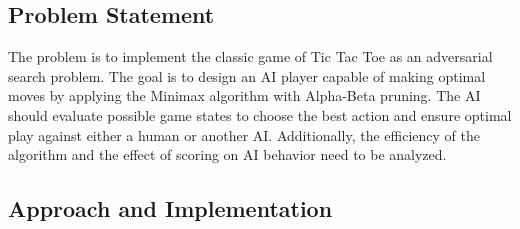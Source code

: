 \documentclass[14pt]{extreport}
\begin{document}


\pagebreak

\subsection*{Problem Statement}

The problem is to implement the classic game of Tic Tac Toe as an adversarial search problem. The goal is to design an AI player capable of making optimal moves by applying the Minimax algorithm with Alpha-Beta pruning. The AI should evaluate possible game states to choose the best action and ensure optimal play against either a human or another AI. Additionally, the efficiency of the algorithm and the effect of scoring on AI behavior need to be analyzed.


\subsection*{Approach and Implementation}
\end{document}
